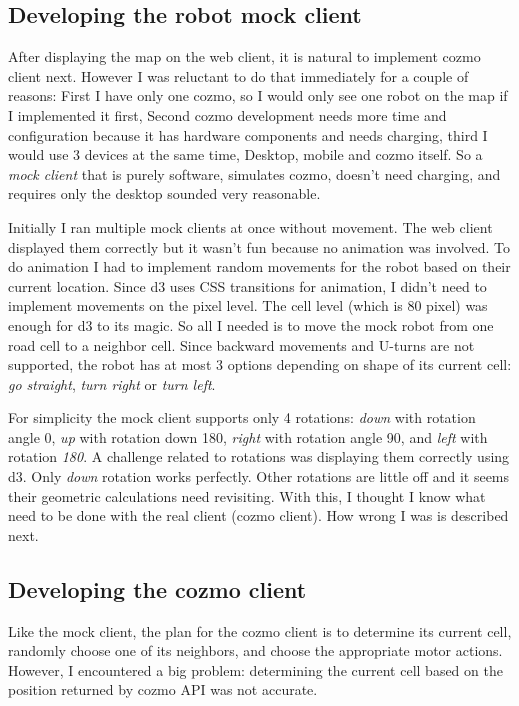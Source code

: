 \documentclass[12pt,a4paper]{article}
\begin{document}
\subsection{Developing the robot mock client}

After displaying the map on the web client, it is natural to implement cozmo client next. However I was reluctant to do that immediately for a couple of reasons: First I have only one cozmo, so I would only see one robot on the map if I implemented it first, Second cozmo development needs more time and configuration because it has hardware components and needs charging, third I would use 3 devices at the same time, Desktop, mobile and cozmo itself. So a \textit{mock client} that is purely software, simulates cozmo, doesn't need charging,  and requires only the desktop sounded very reasonable. 

Initially I ran multiple mock clients at once without movement. The web client displayed them correctly but it wasn't fun because no animation was involved. To do animation I had to implement random movements for the robot based on their current location. Since d3 uses CSS transitions for animation, I didn't need to implement movements on the pixel level. The cell level (which is 80 pixel) was enough for d3 to its magic. So all I needed is to move the mock robot from one road cell to a neighbor cell. Since backward movements and U-turns are not supported, the robot has at most 3 options depending on shape of its current cell: \textit{go straight}, \textit{turn right} or \textit{turn left}. 

For simplicity the mock client supports only 4 rotations: \textit{down} with rotation angle 0, \textit{up} with rotation down 180, \textit{right} with rotation angle 90, and \textit{left} with rotation \textit{180}. A challenge related to rotations was displaying them correctly using d3. Only \textit{down} rotation works perfectly. Other rotations are little off and it seems their geometric calculations need revisiting. With this, I thought I know what need to be done with the real client (cozmo client). How wrong I was is described next. 

\subsection{Developing the cozmo client} \label{sec:failures}

Like the mock client, the plan for the cozmo client is to determine its current cell, randomly choose one of its neighbors, and choose the appropriate motor actions. However, I encountered a big problem: determining the current cell based on the position returned by cozmo  API was not accurate. 
\end{document}
